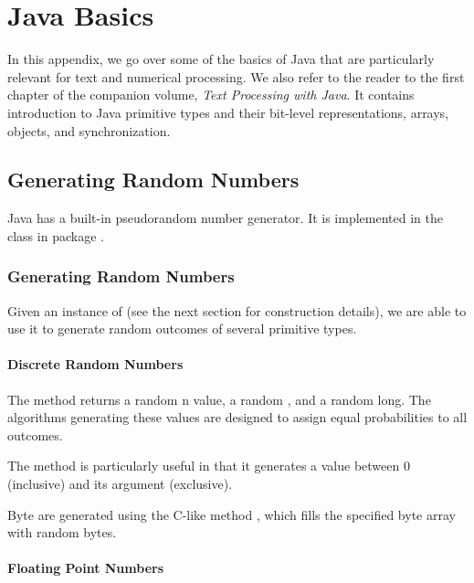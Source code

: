 \chapter{Java Basics}\label{chapter:java}

In this appendix, we go over some of the basics of Java that are
particularly relevant for text and numerical processing.  We also
refer to the reader to the first chapter of the companion volume, {\it
  Text Processing with Java}.  It contains introduction to Java
primitive types and their bit-level representations, arrays, objects,
and synchronization.


\section{Generating Random Numbers}\label{appendix:java-random}

Java has a built-in pseudorandom number generator.  It is implemented
in the class  in package .  

\subsection{Generating Random Numbers}

Given an instance of  (see the next section for
construction details), we are able to use it to generate random
outcomes of several primitive types. 

\subsubsection{Discrete Random Numbers}

The method  returns a random n
value,  a random , and  a
random long.  The algorithms generating these values are designed to
assign equal probabilities to all outcomes.  

The method  is particularly useful in that it
generates a value between 0 (inclusive) and its argument (exclusive).

Byte are generated using the C-like method ,
which fills the specified byte array with random bytes.  

\subsubsection{Floating Point Numbers}

